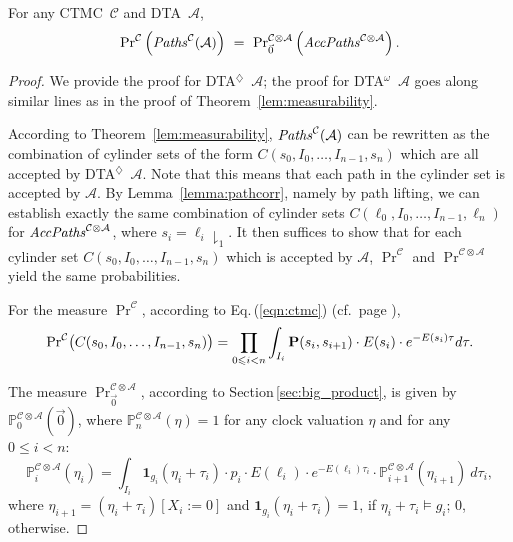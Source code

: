 \documentclass{LMCS}
\newcommand{\mc}[1]{\mathcal{#1}}
\newcommand{\<}{\langle}
\renewcommand{\>}{\rangle}
\newcommand{\les}{\leqslant}
\newcommand{\CTMC}{\textsc{{CTMC}}}
\newcommand{\DTA}{\textsc{DTA}}
\newcommand{\DTAr}{\DTA$^{\!\Ever}$}
\newcommand{\DTAo}{\DTA$^{\omega}$}
\renewcommand{\P}{{\bf P}}
\newcommand{\Paths}{{\it Paths}}
\newcommand{\AccPaths}{{\it AccPaths}}
\newcommand{\Pro}{{\mathbb{P}}}
\newcommand{\F}{\mathop{\diamondsuit}}
\newcommand{\Ever}{\F}
\begin{document}
\begin{thm}\label{th:CTMC=MTA}
For any \CTMC\ $\mc{C}$ and \DTA\ $\mc{A}$,
$${\Pr}^{\mc{C}}\left(\Paths^{\mc{C}}(\mc{A})\right) \ = \
{\Pr}^{\mc{C}\otimes\mc{A}}_{\vec{0}}\left({\AccPaths}^{\mc{C}\otimes\mc{A}} \right).$$
\end{thm}
\begin{proof}
We provide the proof for \DTAr\ $\mc{A}$; the proof for \DTAo\ $\mc{A}$ goes along similar
lines as in the proof of Theorem~\ref{lem:measurability}.
\bigskip

According to Theorem~\ref{lem:measurability},
$\Paths^{\mc{C}}(\mc{A})$ can be rewritten as the combination of
cylinder sets of the form $C(s_0,I_0,\ldots,I_{n-1},s_n)$ which
are all accepted by \DTAr\ $\mc{A}$. Note that this means that
each path in the cylinder set is accepted by $\mc{A}$. By
Lemma~\ref{lemma:pathcorr}, namely by path lifting, we can
establish exactly the same combination of cylinder sets
$C(\ell_0,I_0,\ldots,I_{n-1},\ell_n)$ for $\AccPaths^{\mc{C}\otimes
\mc{A}}$, where
$s_i=\ell_i{\downharpoonright_1}$. It then suffices to show that
for each cylinder set $C(s_0,I_0,\ldots,I_{n-1},s_n)$ which is
accepted by $\mc{A}$, ${\Pr}^{\mc{C}}$ and
${\Pr}^{\mc{C}\otimes\mc{A}}$ yield the same probabilities.

For the measure $\Pr^{\mc{C}}$, according to Eq.\,(\ref{eqn:ctmc}) (cf.\
page \pageref{eqn:ctmc}),
\[{\Pr}^{\mc{C}}\big(C(s_0,I_0,\ldots,I_{n-1},s_n)\big)
= \prod_{0\leqslant  i< n}\int_{I_i}\P(s_i,s_{i+1})\cdot
E(s_i)\cdot e^{-E(s_i)\tau} d\tau. \]

The measure ${\Pr}^{\mc{C}\otimes\mc{A}}_{\vec{0}}$, according
to Section\,\ref{sec:big_product}, is given by
$\Pro^{\mc{C}\otimes\mc{A}}_0(\vec{0})$, where
$\Pro^{\mc{C}\otimes\mc{A}}_n(\eta)=1$ for any clock valuation
$\eta$ and for any $0\les i<n$:
\[
\Pro^{\mc{C}\otimes\mc{A}}_{i}(\eta_{i})=\int_{I_{i}}\mathbf{1}_{g_i}(\eta_i+\tau_i)
{\cdot}p_i{\cdot}E(\ell_i){\cdot}e^{-E(\ell_i)\tau_i}\cdot\Pro^{\mc{C}\otimes\mc{A}}_{i+1}(\eta_{i+1})\
d\tau_i,
\]
where $\eta_{i+1}=(\eta_i+\tau_i)[X_{i}:=0]$ and
$\mathbf{1}_{g_i}(\eta_i+\tau_i)=1$, if $\eta_i+\tau_i\models g_{i}$;
$0$, otherwise.


\end{proof}
\end{document}
